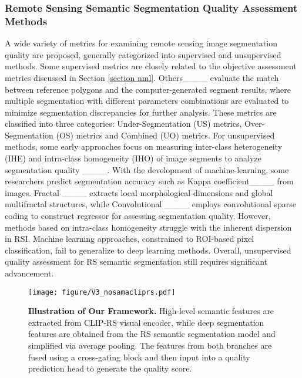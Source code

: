 \subsubsection{Remote Sensing Semantic Segmentation Quality Assessment Methods}\label{section rsml}
A wide variety of metrics for examining remote sensing image segmentation quality are proposed, generally categorized into supervised and unsupervised methods. Some supervised metrics are closely related to the objective assessment metrics discussed in Section \ref{section nml}. Others____ evaluate the match between reference polygons and the computer-generated segment results, where multiple segmentation with different parameters combinations are evaluated to minimize segmentation discrepancies for further analysis. These metrics are classified into three categories: Under-Segmentation (US) metrics, Over-Segmentation (OS) metrics and Combined (UO) metrics. For unsupervised methods, some early approaches focus on measuring inter-class heterogeneity (IHE) and intra-class homogeneity (IHO) of image segments to analyze segmentation quality ____. 
With the development of machine-learning, some researchers predict segmentation accuracy such as Kappa coefficient____ from images. Fractal ____ extracts local morphological dimensions and global multifractal structures, while Convolutional ____ employs convolutional sparse coding to construct regressor for assessing segmentation quality. However, methods based on intra-class homogeneity struggle with the inherent dispersion in RSI. Machine learning approaches, constrained to ROI-based pixel classification, fail to generalize to deep learning methods. Overall, unsupervised quality assessment for RS semantic segmentation still requires significant advancement.
\begin{figure*}
\centering %
\texttt{[image: figure/V3\_nosamacliprs.pdf]}

\caption{ \textbf{Illustration of Our Framework.} High-level semantic features are extracted from CLIP-RS visual encoder, while deep segmentation features are obtained from the RS semantic segmentation model and simplified via average pooling. The features from both branches are fused using a cross-gating block and then input into a quality prediction head to generate the quality score.}
\label{figure1}
\end{figure*}
